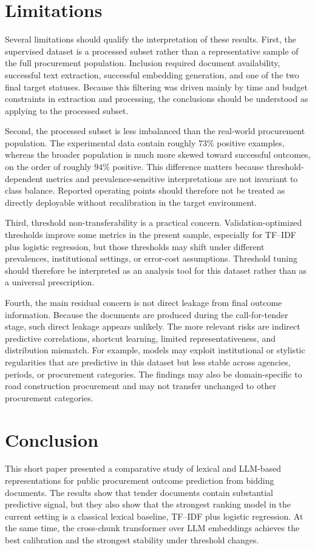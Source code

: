 \documentclass[conference]{IEEEtran}
\begin{document}
\section{Limitations}
Several limitations should qualify the interpretation of these results. First, the supervised dataset is a processed subset rather than a representative sample of the full procurement population. Inclusion required document availability, successful text extraction, successful embedding generation, and one of the two final target statuses. Because this filtering was driven mainly by time and budget constraints in extraction and processing, the conclusions should be understood as applying to the processed subset.

Second, the processed subset is less imbalanced than the real-world procurement population. The experimental data contain roughly $73\%$ positive examples, whereas the broader population is much more skewed toward successful outcomes, on the order of roughly $94\%$ positive. This difference matters because threshold-dependent metrics and prevalence-sensitive interpretations are not invariant to class balance. Reported operating points should therefore not be treated as directly deployable without recalibration in the target environment.

Third, threshold non-transferability is a practical concern. Validation-optimized thresholds improve some metrics in the present sample, especially for TF--IDF plus logistic regression, but those thresholds may shift under different prevalences, institutional settings, or error-cost assumptions. Threshold tuning should therefore be interpreted as an analysis tool for this dataset rather than as a universal prescription.

Fourth, the main residual concern is not direct leakage from final outcome information. Because the documents are produced during the call-for-tender stage, such direct leakage appears unlikely. The more relevant risks are indirect predictive correlations, shortcut learning, limited representativeness, and distribution mismatch. For example, models may exploit institutional or stylistic regularities that are predictive in this dataset but less stable across agencies, periods, or procurement categories. The findings may also be domain-specific to road construction procurement and may not transfer unchanged to other procurement categories.

\section{Conclusion}
This short paper presented a comparative study of lexical and LLM-based representations for public procurement outcome prediction from bidding documents. The results show that tender documents contain substantial predictive signal, but they also show that the strongest ranking model in the current setting is a classical lexical baseline, TF--IDF plus logistic regression. At the same time, the cross-chunk transformer over LLM embeddings achieves the best calibration and the strongest stability under threshold changes.
\end{document}
